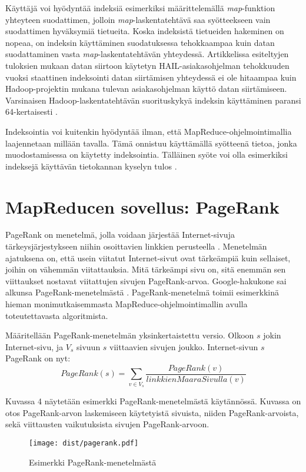 \documentclass[finnish]{templates/tktltiki2}
\theoremstyle{definition}
\theoremstyle{remark}
\begin{document}
Käyttäjä voi hyödyntää indeksiä esimerkiksi määrittelemällä
\emph{map}-funktion yhteyteen suodattimen, jolloin
\emph{map}-laskentatehtävä saa syötteekseen vain suodattimen hyväksymiä
tietueita. Koska indeksistä tietueiden hakeminen on nopeaa, on indeksin
käyttäminen suodatuksessa tehokkaampaa kuin datan suodattaminen vasta
\emph{map}-laskentatehtävän yhteydessä. Artikkelissa esiteltyjen
tuloksien mukaan datan siirtoon käytetyn HAIL-asiakasohjelman
tehokkuuden vuoksi staattinen indeksointi datan siirtämisen yhteydessä
ei ole hitaampaa kuin Hadoop-projektin mukana tulevan asiakasohjelman
käyttö datan siirtämiseen. Varsinaisen Hadoop-laskentatehtävän
suorituskykyä indeksin käyttäminen paransi 64-kertaisesti
\cite{hail}.

Indeksointia voi kuitenkin hyödyntää ilman, että
MapReduce-ohjelmointimallia laajennetaan millään tavalla. Tämä onnistuu
käyttämällä syötteenä tietoa, jonka muodostamisessa on käytetty
indeksointia. Tälläinen syöte voi olla esimerkiksi indeksejä käyttävän
tietokannan kyselyn tulos \cite{mapreduce2}.

\section{MapReducen sovellus:
PageRank}\label{mapreducen-sovellus-pagerank}

PageRank on menetelmä, jolla voidaan järjestää Internet-sivuja
tärkeysjärjestykseen niihin osoittavien linkkien perusteella
\cite{pagerank}. Menetelmän ajatuksena on, että usein viitatut
Internet-sivut ovat tärkeämpiä kuin sellaiset, joihin on vähemmän
viitattauksia. Mitä tärkeämpi sivu on, sitä enemmän sen viittaukset
nostavat viitattujen sivujen PageRank-arvoa. Google-hakukone sai alkunsa
PageRank-menetelmästä \cite{pagerank}. PageRank-menetelmä toimii
esimerkkinä hieman monimutkaisemmasta MapReduce-ohjelmointimallin avulla
toteutettavasta algoritmista.

Määritellään PageRank-menetelmän yksinkertaistettu versio. Olkoon \(s\)
jokin Internet-sivu, ja \(V_s\) sivuun \(s\) viittaavien sivujen joukko.
Internet-sivun \(s\) PageRank on nyt: \[
PageRank(s) = \sum_{v \in V_s} \frac {PageRank(v)} {linkkienMaaraSivulla(v)}
\]

Kuvassa 4 näytetään esimerkki PageRank-menetelmästä käytännössä. Kuvassa
on otos PageRank-arvon laskemiseen käytetyistä sivuista, niiden
PageRank-arvoista, sekä viittausten vaikutuksista sivujen
PageRank-arvoon.

\begin{figure}[!b]
\centering
\texttt{[image: dist/pagerank.pdf]}
\caption{Esimerkki PageRank-menetelmästä}
\end{figure}
\end{document}
